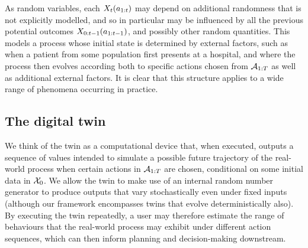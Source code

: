 
As random variables, each $X_{t}(a_{1:t})$ may depend on additional randomness that is not explicitly modelled, and so in particular may be influenced by all the previous potential outcomes $X_{0:t-1}(a_{1:t-1})$, and possibly other random quantities.
This models a process whose initial state is determined by external factors, such as when a patient from some population first presents at a hospital, and where the process then evolves according both to specific actions chosen from $\mathcal{A}_{1:T}$ as well as additional external factors.
It is clear that this structure applies to a wide range of phenomena occurring in practice.



\subsection{The digital twin}

We think of the twin as a computational device that, when executed, outputs a sequence of values intended to simulate a possible future trajectory of the real-world process when certain actions in $\mathcal{A}_{1:T}$ are chosen, conditional on some initial data in $\mathcal{X}_0$.
We allow the twin to make use of an internal random number generator to produce outputs that vary stochastically even under fixed inputs (although our framework encompasses twins that evolve deterministically also).
By executing the twin repeatedly, a user may therefore estimate the range of behaviours that the real-world process may exhibit under different action sequences, which can then inform planning and decision-making downstream.

